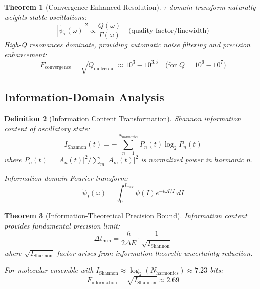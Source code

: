 \documentclass[12pt,a4paper]{article}
\newtheorem{theorem}{Theorem}[section]
\newtheorem{definition}[theorem]{Definition}
\begin{document}
\begin{theorem}[Convergence-Enhanced Resolution]
$\tau$-domain transform naturally weights stable oscillations:
\begin{equation}
|\tilde{\psi}_{\tau}(\omega)|^2 \propto \frac{Q(\omega)}{\Gamma(\omega)} \quad \text{(quality factor/linewidth)}
\end{equation}
High-Q resonances dominate, providing automatic noise filtering and precision enhancement:
\begin{equation}
F_{\text{convergence}} = \sqrt{Q_{\text{molecular}}} \approx 10^{3} - 10^{3.5} \quad \text{(for } Q = 10^6 - 10^7)
\end{equation}
\end{theorem}

\subsection{Information-Domain Analysis}

\begin{definition}[Information Content Transformation]
Shannon information content of oscillatory state:
\begin{equation}
I_{\text{Shannon}}(t) = -\sum_{n=1}^{N_{\text{harmonics}}} P_n(t) \log_2 P_n(t)
\end{equation}
where $P_n(t) = |A_n(t)|^2 / \sum_m |A_m(t)|^2$ is normalized power in harmonic $n$.

Information-domain Fourier transform:
\begin{equation}
\tilde{\psi}_I(\omega) = \int_0^{I_{\text{max}}} \psi(I) e^{-i\omega I/I_0} dI
\end{equation}
\end{definition}

\begin{theorem}[Information-Theoretical Precision Bound]
Information content provides fundamental precision limit:
\begin{equation}
\Delta t_{\text{min}} = \frac{\hbar}{2 \Delta E} \cdot \frac{1}{\sqrt{I_{\text{Shannon}}}}
\end{equation}
where $\sqrt{I_{\text{Shannon}}}$ factor arises from information-theoretic uncertainty reduction.

For molecular ensemble with $I_{\text{Shannon}} \approx \log_2(N_{\text{harmonics}}) \approx 7.23$ bits:
\begin{equation}
F_{\text{information}} = \sqrt{I_{\text{Shannon}}} \approx 2.69
\end{equation}
\end{theorem}
\end{document}
